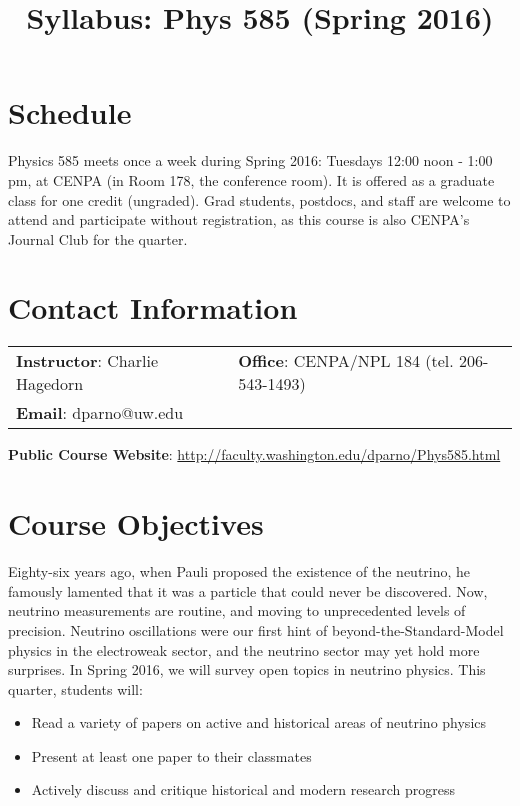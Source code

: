 \documentclass[12pt]{amsart}
\title{Syllabus: Phys 585 (Spring 2016)}
\date{} %
\begin{document}
\maketitle

\section{Schedule}

Physics 585 meets once a week during Spring 2016: Tuesdays 12:00 noon - 1:00 pm, at CENPA (in Room 178, the conference room). It is offered as a graduate class for one credit (ungraded). Grad students, postdocs, and staff are welcome to attend and participate without registration, as this course is also CENPA's Journal Club for the quarter.

\section{Contact Information}
\begin{tabular}{lcl}
\textbf{Instructor}: Charlie Hagedorn &             & \textbf{Office}: CENPA/NPL 184 (tel. 206-543-1493) \\
\textbf{Email}: dparno@uw.edu &             &  \\
\hline
\end{tabular}\newline

\textbf{Public Course Website}: \url{http://faculty.washington.edu/dparno/Phys585.html}

\section{Course Objectives}

Eighty-six years ago, when Pauli proposed the existence of the neutrino, he famously lamented that it was a particle that could never be discovered. Now, neutrino measurements are routine, and moving to unprecedented levels of precision. Neutrino oscillations were our first hint of beyond-the-Standard-Model physics in the electroweak sector, and the neutrino sector may yet hold more surprises. In Spring 2016, we will survey open topics in neutrino physics. This quarter, students will:

\begin{itemize}
	\item	Read a variety of papers on active and historical areas of neutrino physics
	\item	Present at least one paper to their classmates
	\item	Actively discuss and critique historical and modern research progress
\end{itemize}
\end{document}
